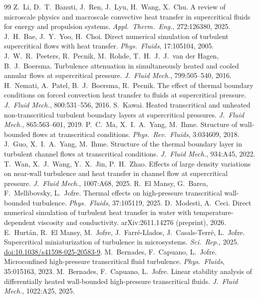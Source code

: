 \documentclass[11pt]{article}
\begin{document}
\begin{thebibliography}{99}
 Z.\ Li, D.\ T.\ Banuti, J.\ Ren, J.\ Lyu, H.\ Wang, X.\ Chu. A review of microscale physics and macroscale convective heat transfer in supercritical fluids for energy and propulsion systems. \emph{Appl.\ Therm.\ Eng.}, 272:126380, 2025.
 J.\ H.\ Bae, J.\ Y.\ Yoo, H.\ Choi. Direct numerical simulation of turbulent supercritical flows with heat transfer. \emph{Phys.\ Fluids}, 17:105104, 2005.
 J.\ W.\ R.\ Peeters, R.\ Pecnik, M.\ Rohde, T.\ H.\ J.\ J.\ van der Hagen, B.\ J.\ Boersma. Turbulence attenuation in simultaneously heated and cooled annular flows at supercritical pressure. \emph{J.\ Fluid Mech.}, 799:505--540, 2016.
 H.\ Nemati, A.\ Patel, B.\ J.\ Boersma, R.\ Pecnik. The effect of thermal boundary conditions on forced convection heat transfer to fluids at supercritical pressure. \emph{J.\ Fluid Mech.}, 800:531--556, 2016.
 S.\ Kawai. Heated transcritical and unheated non-transcritical turbulent boundary layers at supercritical pressures. \emph{J.\ Fluid Mech.}, 865:563--601, 2019.
 P.\ C.\ Ma, X.\ I.\ A.\ Yang, M.\ Ihme. Structure of wall-bounded flows at transcritical conditions. \emph{Phys.\ Rev.\ Fluids}, 3:034609, 2018.
 J.\ Guo, X.\ I.\ A.\ Yang, M.\ Ihme. Structure of the thermal boundary layer in turbulent channel flows at transcritical conditions. \emph{J.\ Fluid Mech.}, 934:A45, 2022.
 T.\ Wan, X.\ J.\ Wang, Y.\ X.\ Jin, P.\ H.\ Zhao. Effects of large density variations on near-wall turbulence and heat transfer in channel flow at supercritical pressure. \emph{J.\ Fluid Mech.}, 1007:A68, 2025.
 R.\ El Mansy, G.\ Barea, F.\ Mellibovsky, L.\ Jofre. Thermal effects on high-pressure transcritical wall-bounded turbulence. \emph{Phys.\ Fluids}, 37:105119, 2025.
 D.\ Modesti, A.\ Ceci. Direct numerical simulation of turbulent heat transfer in water with temperature-dependent viscosity and conductivity. arXiv:2611.14276 (preprint), 2026.
 E.\ Hurt\'an, R.\ El Mansy, M.\ Jofre, J.\ Farr\'e-Llados, J.\ Casals-Terr\'e, L.\ Jofre. Supercritical miniaturization of turbulence in microsystems. \emph{Sci.\ Rep.}, 2025. \href{https://doi.org/10.1038/s41598-025-20583-9}{doi:10.1038/s41598-025-20583-9}.
 M.\ Bernades, F.\ Capuano, L.\ Jofre. Microconfined high-pressure transcritical fluid turbulence. \emph{Phys.\ Fluids}, 35:015163, 2023.
 M.\ Bernades, F.\ Capuano, L.\ Jofre. Linear stability analysis of differentially heated wall-bounded high-pressure transcritical fluids. \emph{J.\ Fluid Mech.}, 1022:A25, 2025.

\end{thebibliography}
\end{document}
